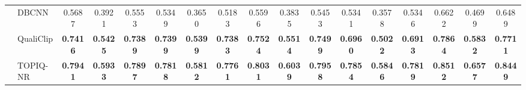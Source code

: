 \documentclass{article}
\newcommand{\CLA}[1]{{\color[HTML]{4472c4} \textbf{#1}}}
\newcommand{\CLB}[1]{{\color[HTML]{E76254} \textbf{#1}}}
\begin{document}
\begin{table}[t]
{\begin{tabular}{l|l|ccc|ccc|ccc|ccc|ccc}
\\
                      & DBCNN \cite{quality:DBCNN}        & \colorbox{gray!20}{0.5687}&\colorbox{gray!20}{0.3921}&\colorbox{gray!20}{0.5553}&\colorbox{gray!20}{0.5349}&\colorbox{gray!20}{0.3650}&\colorbox{gray!20}{0.5183}&\colorbox{gray!20}{0.5596}&\colorbox{gray!20}{0.3835}&\colorbox{gray!20}{0.5453}&\colorbox{gray!20}{0.5341}&\colorbox{gray!20}{0.3578}&\colorbox{gray!20}{0.5346}&\colorbox{gray!20}{0.6622}&\colorbox{gray!20}{0.4699}&\colorbox{gray!20}{0.6489}



 \\
                      & QualiClip\cite{quality:qualiclip}     & \CLB{0.7416} & \CLB{0.5425} & \CLB{0.7389} & \CLB{0.7399} & \CLB{0.5399} & \CLB{0.7383} & \CLB{0.7524} & \CLB{0.5514} & \CLB{0.7499} & \CLB{0.6960} & \CLB{0.5022} & \CLB{0.6913} & \CLB{0.7864} & \CLB{0.5832} & \CLB{0.7711}



\\
                      & TOPIQ-NR \cite{quality:topiq}     & \CLA{0.7941}&\CLA{0.5933}&\CLA{0.7897}&\CLA{0.7818}&\CLA{0.5812}&\CLA{0.7761}&\CLA{0.8031}&\CLA{0.6039}&\CLA{0.7958}&\CLA{0.7854}&\CLA{0.5846}&\CLA{0.7819}&\CLA{0.8512}&\CLA{0.6577}&\CLA{0.8449}



 \\ \bottomrule
\end{tabular}}

\end{table}
\end{document}
